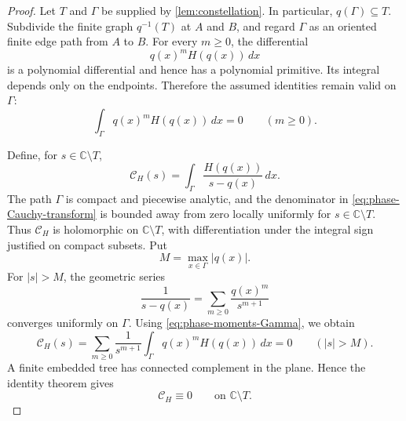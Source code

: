 \documentclass[11pt]{article}
\numberwithin{equation}{section}
\theoremstyle{definition}
\theoremstyle{remark}
\newcommand{\C}{\mathbb C}
\begin{document}
\begin{proof}
Let $T$ and $\Gamma$ be supplied by \cref{lem:constellation}.  In particular,
$q(\Gamma)\subseteq T$.  Subdivide the finite graph $q^{-1}(T)$ at $A$ and
$B$, and regard $\Gamma$ as an oriented finite edge path from $A$ to $B$.
For every $m\ge0$, the differential
\[
  q(x)^mH(q(x))\,dx
\]
is a polynomial differential and hence has a polynomial primitive.  Its
integral depends only on the endpoints.  Therefore the assumed identities
remain valid on $\Gamma$:
\begin{equation}\label{eq:phase-moments-Gamma}
  \int_\Gamma q(x)^mH(q(x))\,dx=0
  \qquad(m\ge0).
\end{equation}

Define, for $s\in\C\setminus T$,
\begin{equation}\label{eq:phase-Cauchy-transform}
  \mathcal C_H(s)
  =\int_\Gamma\frac{H(q(x))}{s-q(x)}\,dx.
\end{equation}
The path $\Gamma$ is compact and piecewise analytic, and the denominator in
\eqref{eq:phase-Cauchy-transform} is bounded away from zero locally uniformly
for $s\in\C\setminus T$.  Thus $\mathcal C_H$ is holomorphic on
$\C\setminus T$, with differentiation under the integral sign justified on
compact subsets.  Put
\[
  M=\max_{x\in\Gamma}|q(x)|.
\]
For $|s|>M$, the geometric series
\[
  \frac1{s-q(x)}=\sum_{m\ge0}\frac{q(x)^m}{s^{m+1}}
\]
converges uniformly on $\Gamma$.  Using \eqref{eq:phase-moments-Gamma}, we
obtain
\[
  \mathcal C_H(s)
  =\sum_{m\ge0}\frac1{s^{m+1}}
    \int_\Gamma q(x)^mH(q(x))\,dx
  =0
  \qquad(|s|>M).
\]
A finite embedded tree has connected complement in the plane.  Hence the
identity theorem gives
\begin{equation}\label{eq:phase-Cauchy-zero}
  \mathcal C_H\equiv0
  \qquad\text{on }\C\setminus T.
\end{equation}


\end{proof}
\end{document}
